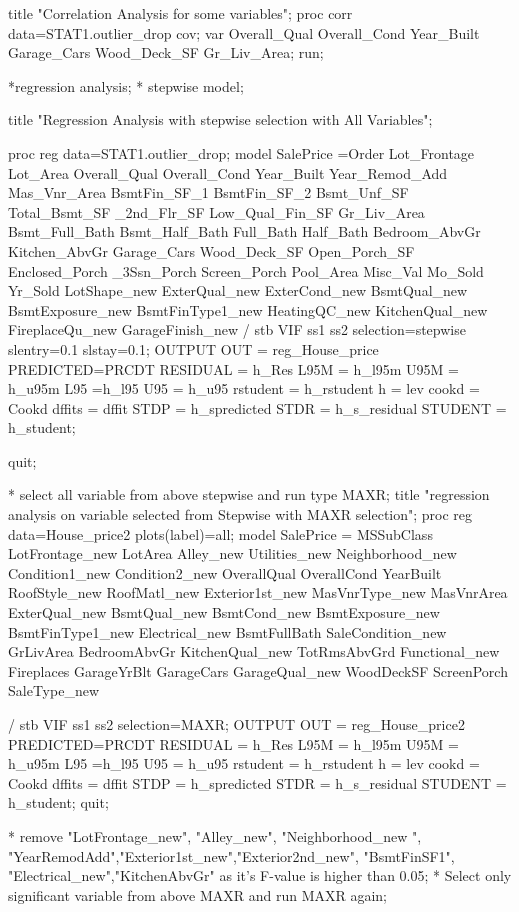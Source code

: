 title	"Correlation Analysis for some variables";
proc corr data=STAT1.outlier_drop  cov;
var 	Overall_Qual		Overall_Cond		Year_Built						
			Garage_Cars		Wood_Deck_SF		Gr_Liv_Area;
run;

*regression analysis;
* stepwise model;

title "Regression Analysis with stepwise selection with All Variables";

proc reg data=STAT1.outlier_drop;
	model 	SalePrice =Order Lot_Frontage Lot_Area Overall_Qual Overall_Cond Year_Built 
		Year_Remod_Add Mas_Vnr_Area BsmtFin_SF_1 BsmtFin_SF_2 Bsmt_Unf_SF 
		Total_Bsmt_SF _2nd_Flr_SF Low_Qual_Fin_SF Gr_Liv_Area Bsmt_Full_Bath 
		Bsmt_Half_Bath Full_Bath Half_Bath Bedroom_AbvGr Kitchen_AbvGr Garage_Cars 
		Wood_Deck_SF Open_Porch_SF Enclosed_Porch _3Ssn_Porch Screen_Porch Pool_Area 
		Misc_Val Mo_Sold Yr_Sold LotShape_new ExterQual_new ExterCond_new 
		BsmtQual_new BsmtExposure_new BsmtFinType1_new HeatingQC_new KitchenQual_new 
		FireplaceQu_new GarageFinish_new		
	/   stb     VIF ss1 ss2 selection=stepwise slentry=0.1 slstay=0.1;
	OUTPUT OUT = reg_House_price PREDICTED=PRCDT RESIDUAL = h_Res
	L95M = h_l95m U95M  = h_u95m L95 =h_l95 U95 = h_u95 
	rstudent = h_rstudent h = lev cookd = Cookd dffits = dffit 
	STDP = h_spredicted STDR = h_s_residual STUDENT = h_student;
      
quit;

* select all variable from above stepwise and run type MAXR;
title "regression analysis on variable selected from Stepwise with MAXR selection";
proc reg data=House_price2
plots(label)=all;
	model 	SalePrice =		
			MSSubClass		LotFrontage_new	LotArea				Alley_new
			Utilities_new	Neighborhood_new Condition1_new	Condition2_new		OverallQual		
			OverallCond		YearBuilt		RoofStyle_new	RoofMatl_new	Exterior1st_new			MasVnrType_new	
			MasVnrArea		ExterQual_new	BsmtQual_new	BsmtCond_new	BsmtExposure_new 
			BsmtFinType1_new Electrical_new	BsmtFullBath	SaleCondition_new	GrLivArea
			BedroomAbvGr	KitchenQual_new	TotRmsAbvGrd	Functional_new	Fireplaces			
			GarageYrBlt		GarageCars		GarageQual_new	WoodDeckSF			ScreenPorch		
			SaleType_new	
			
	/   stb     VIF ss1 ss2 selection=MAXR;
	OUTPUT OUT = reg_House_price2 PREDICTED=PRCDT RESIDUAL = h_Res
	L95M = h_l95m U95M  = h_u95m L95 =h_l95 U95 = h_u95 
	rstudent = h_rstudent h = lev cookd = Cookd dffits = dffit 
	STDP = h_spredicted STDR = h_s_residual STUDENT = h_student;
quit;

* remove "LotFrontage_new", "Alley_new", "Neighborhood_new ", "YearRemodAdd","Exterior1st_new","Exterior2nd_new",
"BsmtFinSF1", "Electrical_new","KitchenAbvGr" as it's F-value is higher than 0.05;
* Select only significant variable from above MAXR and run MAXR again;

